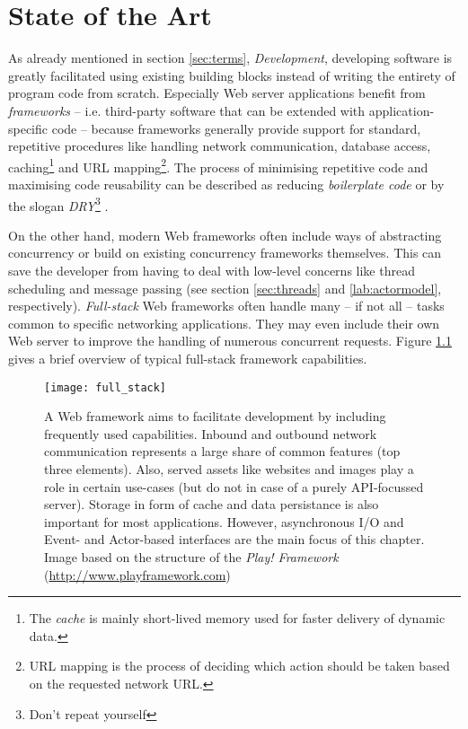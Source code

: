 \chapter{State of the Art}
\label{lab:sota}
As already mentioned in section \ref{sec:terms}, \textit{Development}, developing software is greatly facilitated using existing building blocks instead of writing the entirety of program code from scratch. Especially Web server applications benefit from \textit{frameworks} -- i.e. third-party software that can be extended with application-specific code -- because frameworks generally provide support for standard, repetitive procedures like handling network communication, database access, caching\footnote{The \textit{cache} is mainly short-lived memory used for faster delivery of dynamic data.} and URL mapping\footnote{URL mapping is the process of deciding which action should be taken based on the requested network URL.}. The process of minimising repetitive code and maximising code reusability can be described as reducing \textit{boilerplate code} or by the slogan \textit{DRY}\footnote{Don't repeat yourself} \cite[p. 149]{Scala} \cite[p. 1]{Orsini2008}.

On the other hand, modern Web frameworks often include ways of abstracting concurrency or build on existing concurrency frameworks themselves. This can save the developer from having to deal with low-level concerns like thread scheduling and message passing (see section \ref{sec:threads} and \ref{lab:actormodel}, respectively). \textit{Full-stack} Web frameworks often handle many -- if not all -- tasks common to specific networking applications. They may even include their own Web server to improve the handling of numerous concurrent requests. Figure \ref{fig:full_stack} gives a brief overview of typical full-stack framework capabilities. 

\begin{figure}
\centering\small
\setlength{\tabcolsep}{0mm}
  \texttt{[image: full\_stack]}
\caption{
A Web framework aims to facilitate development by including frequently used capabilities. Inbound and outbound network communication represents a large share of common features (top three elements). Also, served assets like websites and images play a role in certain use-cases (but do not in case of a purely API-focussed server). Storage in form of cache and data persistance is also important for most applications. However, asynchronous I/O and Event- and Actor-based interfaces are the main focus of this chapter. Image based on the structure of the \textit{Play! Framework} (\url{http://www.playframework.com}) \cite{Scala}
}
\label{fig:full_stack}
\end{figure}

